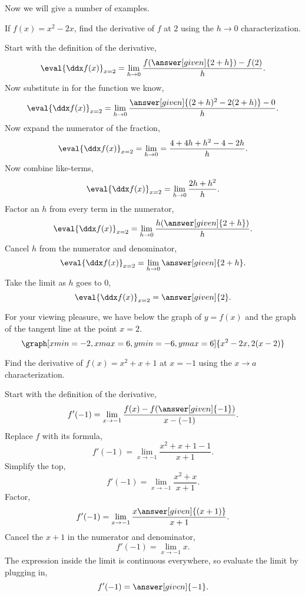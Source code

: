 \documentclass{ximera}
\begin{document}
Now we will give a number of examples.
\begin{example}
  If $f(x) = x^2-2x$, find the derivative of $f$ at $2$ using the $h\to0$
  characterization.
  \begin{explanation}
    Start with the definition of the derivative,
    \[
    \eval{\ddx f(x)}_{x=2} = \lim_{h\to 0} \frac{f(\answer[given]{2+h})-f(2)}{h}.
    \] 
     Now substitute in for the function we know,
    \[
    \eval{\ddx f(x)}_{x=2} = \lim_{h\to 0}\frac{\answer[given]{(2+h)^2-2(2+h)} -0}{h}.
    \]
    Now expand the numerator of the fraction,
    \[
    \eval{\ddx f(x)}_{x=2} = \lim_{h\to 0} = \frac{4+4h+h^2-4-2h }{h}.
    \]
    Now combine like-terms,
    \[
    \eval{\ddx f(x)}_{x=2} = \lim_{h\to 0}\frac{2h+h^2}{h}.
    \]
    Factor an $h$ from every term in the numerator,
    \[
    \eval{\ddx f(x)}_{x=2} = \lim_{h\to 0}\frac{h(\answer[given]{2+h})}{h}.
    \]
    Cancel $h$ from the numerator and denominator,
    \[
    \eval{\ddx f(x)}_{x=2} = \lim_{h\to 0}\answer[given]{2+h}. 
    \]
    Take the limit as $h$ goes to $0$,
    \[
    \eval{\ddx f(x)}_{x=2} = \answer[given]{2}.
    \]
    \begin{onlineOnly}
    For your viewing pleasure, we have below the graph of $y=f(x)$ and the graph of the tangent line at the point $x=2$. 
    \[
    \graph[xmin=-2,xmax=6,ymin=-6,ymax=6]{x^2-2x, 2(x-2)}
    \]
    \end{onlineOnly}
\end{explanation}
\end{example}

\begin{example}
	Find the derivative of $f(x) = x^2+x+1$ at $x=-1$ using the $x\to a$
	characterization.
	\begin{explanation}
		Start with the definition of the derivative,
		\[
		f'(-1) = \lim_{x\to-1}\frac{f(x)-f(\answer[given]{-1})}{x-(-1)}.
		\] 
		Replace $f$ with its formula,
		\[
		f'(-1) = \lim_{x\to-1}\frac{x^2+x+1 - 1}{x+1}.
		\]
		Simplify the top,
		\[
		f'(-1) = \lim_{x\to-1}\frac{x^2+x}{x+1}.
		\]
		Factor,
		\[
		f'(-1) = \lim_{x\to-1}\frac{x\answer[given]{(x+1)}}{x+1}.
		\]
		Cancel the $x+1$ in the numerator and denominator,
		\[
		f'(-1) = \lim_{x\to-1}x.
		\]
		The expression inside the limit is continuous everywhere, so
		evaluate the limit by plugging in,
		\[
		f'(-1) = \answer[given]{-1}.
		\]
	\end{explanation}
\end{example}
\end{document}
